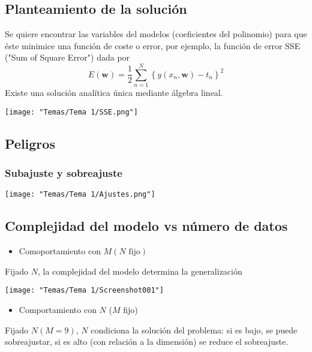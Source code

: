 \subsection{Planteamiento de la solución}
Se quiere encontrar las variables del modelos (coeficientes del polinomio) para que éste minimice una función de coste o error, por ejemplo, la función de error SSE ("Sum of Square Error") dada por \[ E(\mathbf{w})=\dfrac{1}{2}\sum_{n=1}^{N}\left\{y(x_n,\mathbf{w})-t_n\right\}^2 \]Existe una solución analítica única mediante álgebra lineal.


\begin{center}
    \texttt{[image: "Temas/Tema 1/SSE.png"]}
\end{center}

\subsection{Peligros}
\subsubsection{Subajuste y sobreajuste}

\begin{center}
	\texttt{[image: "Temas/Tema 1/Ajustes.png"]}
\end{center}
\subsection{Complejidad del modelo vs número de datos}
\begin{minipage}{0.6\textwidth}
	\begin{itemize}[label=\color{red}\textbullet, leftmargin=*]
		\item \color{lightblue}Comoportamiento con $M(N\text{ fijo})$
	\end{itemize}
	Fijado $N$, la complejidad del modelo determina la generalización
\end{minipage}\qquad\begin{minipage}{0.4\textwidth}
\texttt{[image: "Temas/Tema 1/Screenshot001"]}
\end{minipage}

\begin{minipage}{0.4\textwidth}
	\begin{itemize}[label=\color{red}\textbullet, leftmargin=*]
		\item \color{lightblue}Comportamiento con $N$ ($M$ fijo)
	\end{itemize}
	Fijado $N(M=9)$, $N$ condiciona la solución del problema: si es bajo, se puede sobreajustar, si es alto (con relación a la dimensión) se reduce el sobreajuste.
\end{minipage}